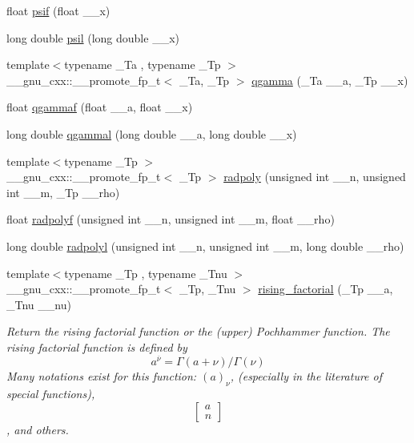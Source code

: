 \begin{DoxyCompactItemize}
\item 
float \hyperlink{group__gnu__math__spec__func_ga47ae74abfaa3f549eed4a87b1b63449d}{psif} (float \+\_\+\+\_\+x)
\item 
long double \hyperlink{group__gnu__math__spec__func_gaaf230aedcb20a1c5a43fc71132bb0dc1}{psil} (long double \+\_\+\+\_\+x)
\item 
{\footnotesize template$<$typename \+\_\+\+Ta , typename \+\_\+\+Tp $>$ }\\\+\_\+\+\_\+gnu\+\_\+cxx\+::\+\_\+\+\_\+promote\+\_\+fp\+\_\+t$<$ \+\_\+\+Ta, \+\_\+\+Tp $>$ \hyperlink{group__gnu__math__spec__func_ga3ef7aeaa55f9e7b02f02d1d605a716a6}{qgamma} (\+\_\+\+Ta \+\_\+\+\_\+a, \+\_\+\+Tp \+\_\+\+\_\+x)
\item 
float \hyperlink{group__gnu__math__spec__func_ga6749b7a7d3b403e79ca4cf676719dd72}{qgammaf} (float \+\_\+\+\_\+a, float \+\_\+\+\_\+x)
\item 
long double \hyperlink{group__gnu__math__spec__func_ga8062654272cc446bb9a36f62d9fc5ab0}{qgammal} (long double \+\_\+\+\_\+a, long double \+\_\+\+\_\+x)
\item 
{\footnotesize template$<$typename \+\_\+\+Tp $>$ }\\\+\_\+\+\_\+gnu\+\_\+cxx\+::\+\_\+\+\_\+promote\+\_\+fp\+\_\+t$<$ \+\_\+\+Tp $>$ \hyperlink{group__gnu__math__spec__func_gac44ad9bda660a21a6b297d313f0ecf48}{radpoly} (unsigned int \+\_\+\+\_\+n, unsigned int \+\_\+\+\_\+m, \+\_\+\+Tp \+\_\+\+\_\+rho)
\item 
float \hyperlink{group__gnu__math__spec__func_ga8a98d7c7c14f1aadff90123a114fa2c9}{radpolyf} (unsigned int \+\_\+\+\_\+n, unsigned int \+\_\+\+\_\+m, float \+\_\+\+\_\+rho)
\item 
long double \hyperlink{group__gnu__math__spec__func_ga377febebd1096400897170bb7a76cd3a}{radpolyl} (unsigned int \+\_\+\+\_\+n, unsigned int \+\_\+\+\_\+m, long double \+\_\+\+\_\+rho)
\item 
{\footnotesize template$<$typename \+\_\+\+Tp , typename \+\_\+\+Tnu $>$ }\\\+\_\+\+\_\+gnu\+\_\+cxx\+::\+\_\+\+\_\+promote\+\_\+fp\+\_\+t$<$ \+\_\+\+Tp, \+\_\+\+Tnu $>$ \hyperlink{group__gnu__math__spec__func_gad9410c6f678c673542d1b6243759ae05}{rising\+\_\+factorial} (\+\_\+\+Tp \+\_\+\+\_\+a, \+\_\+\+Tnu \+\_\+\+\_\+nu)
\begin{DoxyCompactList}\small\item\em Return the rising factorial function or the (upper) Pochhammer function. The rising factorial function is defined by \[ a^{\overline{\nu}} = \Gamma(a + \nu) / \Gamma(\nu) \] Many notations exist for this function\+: $ (a)_\nu $, (especially in the literature of special functions), \[ \left[ \begin{array}{c} a \\ n \end{array} \right] \], and others. \end{DoxyCompactList}\item 

\end{DoxyCompactItemize}
